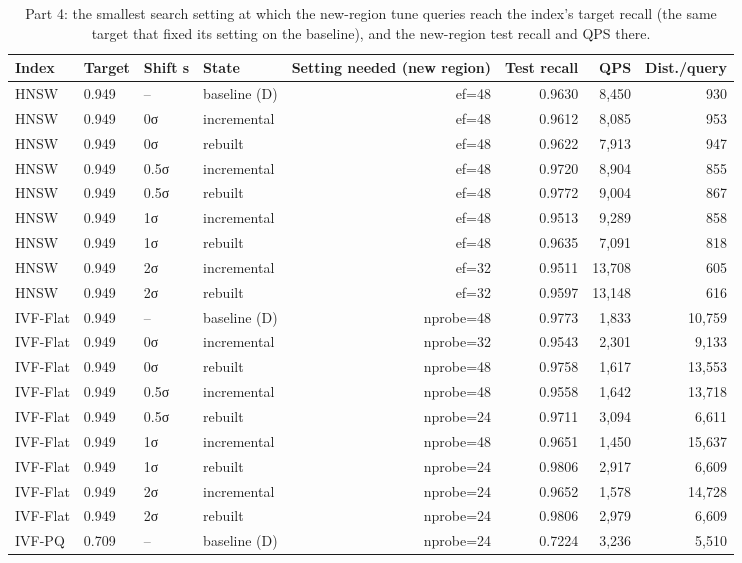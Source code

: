 \begin{table}[t]
\centering
\small
\caption{Part 4: the smallest search setting at which the new-region tune queries reach the index's target recall (the same target that fixed its setting on the baseline), and the new-region test recall and QPS there.}
\label{tab:t4c_drift_retune}
\begin{tabular}{llllrrrr}
\toprule
Index & Target & Shift s & State & Setting needed (new region) & Test recall & QPS & Dist./query \\
\midrule
HNSW & 0.949 & -- & baseline (D) & ef=48 & 0.9630 & 8,450 & 930 \\
HNSW & 0.949 & 0σ & incremental & ef=48 & 0.9612 & 8,085 & 953 \\
HNSW & 0.949 & 0σ & rebuilt & ef=48 & 0.9622 & 7,913 & 947 \\
HNSW & 0.949 & 0.5σ & incremental & ef=48 & 0.9720 & 8,904 & 855 \\
HNSW & 0.949 & 0.5σ & rebuilt & ef=48 & 0.9772 & 9,004 & 867 \\
HNSW & 0.949 & 1σ & incremental & ef=48 & 0.9513 & 9,289 & 858 \\
HNSW & 0.949 & 1σ & rebuilt & ef=48 & 0.9635 & 7,091 & 818 \\
HNSW & 0.949 & 2σ & incremental & ef=32 & 0.9511 & 13,708 & 605 \\
HNSW & 0.949 & 2σ & rebuilt & ef=32 & 0.9597 & 13,148 & 616 \\
IVF-Flat & 0.949 & -- & baseline (D) & nprobe=48 & 0.9773 & 1,833 & 10,759 \\
IVF-Flat & 0.949 & 0σ & incremental & nprobe=32 & 0.9543 & 2,301 & 9,133 \\
IVF-Flat & 0.949 & 0σ & rebuilt & nprobe=48 & 0.9758 & 1,617 & 13,553 \\
IVF-Flat & 0.949 & 0.5σ & incremental & nprobe=48 & 0.9558 & 1,642 & 13,718 \\
IVF-Flat & 0.949 & 0.5σ & rebuilt & nprobe=24 & 0.9711 & 3,094 & 6,611 \\
IVF-Flat & 0.949 & 1σ & incremental & nprobe=48 & 0.9651 & 1,450 & 15,637 \\
IVF-Flat & 0.949 & 1σ & rebuilt & nprobe=24 & 0.9806 & 2,917 & 6,609 \\
IVF-Flat & 0.949 & 2σ & incremental & nprobe=24 & 0.9652 & 1,578 & 14,728 \\
IVF-Flat & 0.949 & 2σ & rebuilt & nprobe=24 & 0.9806 & 2,979 & 6,609 \\
IVF-PQ & 0.709 & -- & baseline (D) & nprobe=24 & 0.7224 & 3,236 & 5,510 \\

\end{tabular}
\end{table}
